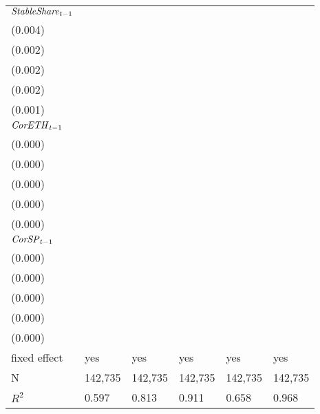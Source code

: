 \begin{tabular}{llllll}
${{\it StableShare}}_{t-1}$  &   \makecell{$0.153^{***}$ \\ (0.004)} &  \makecell{$-0.013^{***}$ \\ (0.002)} &  \makecell{$-0.006^{***}$ \\ (0.002)} &  \makecell{$0.102^{***}$ \\ (0.002)} &   \makecell{$0.011^{***}$ \\ (0.001)} \\
${{\it CorETH}}_{t-1}$       &   \makecell{$0.000^{***}$ \\ (0.000)} &     \makecell{$0.000^{*}$ \\ (0.000)} &      \makecell{$0.000^{}$ \\ (0.000)} &    \makecell{$-0.000^{}$ \\ (0.000)} &     \makecell{$-0.000^{}$ \\ (0.000)} \\
${{\it CorSP}}_{t-1}$        &  \makecell{$-0.000^{***}$ \\ (0.000)} &     \makecell{$-0.000^{}$ \\ (0.000)} &     \makecell{$-0.000^{}$ \\ (0.000)} &     \makecell{$0.000^{}$ \\ (0.000)} &      \makecell{$0.000^{}$ \\ (0.000)} \\
\midrule fixed effect        &                                   yes &                                   yes &                                   yes &                                  yes &                                   yes \\
N                            &                               142,735 &                               142,735 &                               142,735 &                              142,735 &                               142,735 \\
$R^2$                        &                                 0.597 &                                 0.813 &                                 0.911 &                                0.658 &                                 0.968 \\
\bottomrule
\end{tabular}
